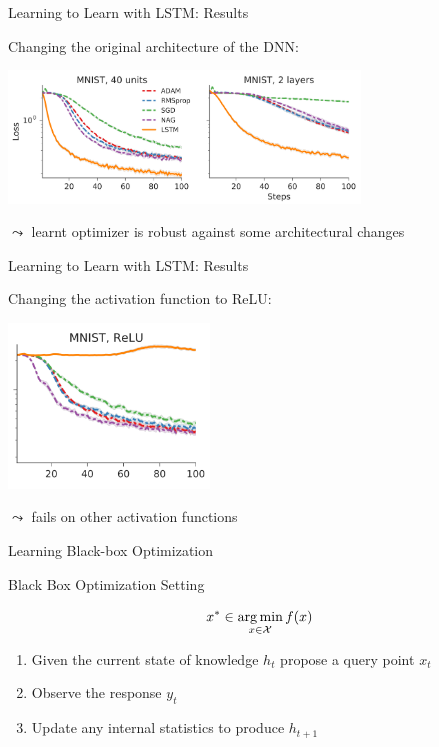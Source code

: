 \begin{frame}[c]{Learning to Learn with LSTM: Results }

Changing the original architecture of the DNN:
\smallskip

\centering
\includegraphics[width=0.7\textwidth]{images/l2l_mnist_okchange}

$\leadsto$ learnt optimizer is robust against some architectural changes

\end{frame}
\begin{frame}[c]{Learning to Learn with LSTM: Results\newline {}}

Changing the activation function to ReLU:
\smallskip

\centering
\includegraphics[width=0.4\textwidth]{images/l2l_mnist_relu}

$\leadsto$ fails on other activation functions

\end{frame}
\begin{frame}[c]{Learning Black-box Optimization~}

\begin{block}{Black Box Optimization Setting}

\begin{equation}
x^* \in \operatorname*{arg\,min}_{x \in \mathcal{X}} f(x) \nonumber
\end{equation}
	
\begin{enumerate}
\item Given the current state of knowledge $h_t$ propose a query point $x_t$
\item Observe the response $y_t$
\item Update any internal statistics to produce $h_{t+1}$
\end{enumerate}
\end{block}


\end{frame}
